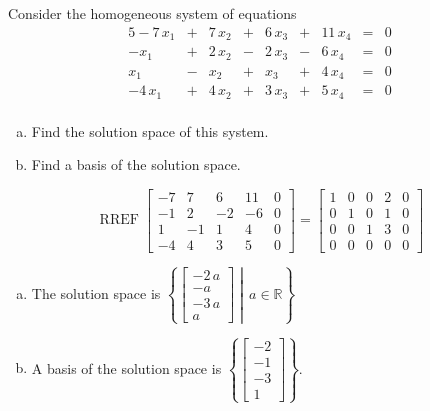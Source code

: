 
\begin{exerciseStatement}


Consider the homogeneous system of equations 
\begin{alignat*}{5} -7 \, x_{1} &+& 7 \, x_{2} &+& 6 \, x_{3} &+& 11 \, x_{4} &=& 0 \\-x_{1} &+& 2 \, x_{2} &-& 2 \, x_{3} &-& 6 \, x_{4} &=& 0 \\x_{1} &-& x_{2} &+& x_{3} &+& 4 \, x_{4} &=& 0 \\-4 \, x_{1} &+& 4 \, x_{2} &+& 3 \, x_{3} &+& 5 \, x_{4} &=& 0 \\ \end{alignat*}
            


\begin{enumerate}[(a)]
\item  Find the solution space of this system.
\item  Find a basis of the solution space.
\end{enumerate}
    
\end{exerciseStatement}
    
\begin{exerciseAnswer} 


\[\operatorname{RREF} \left[\begin{array}{cccc|c}
-7 & 7 & 6 & 11 & 0 \\
-1 & 2 & -2 & -6 & 0 \\
1 & -1 & 1 & 4 & 0 \\
-4 & 4 & 3 & 5 & 0
\end{array}\right] = \left[\begin{array}{cccc|c}
1 & 0 & 0 & 2 & 0 \\
0 & 1 & 0 & 1 & 0 \\
0 & 0 & 1 & 3 & 0 \\
0 & 0 & 0 & 0 & 0
\end{array}\right] \]


\begin{enumerate}[(a)]
\item The solution space is \( \left\{ \left[\begin{array}{c}
-2 \, a \\
-a \\
-3 \, a \\
a
\end{array}\right] \middle|\,a\in\mathbb{R}\right\} \)
\item A basis of the solution space is \( \left\{ \left[\begin{array}{c}
-2 \\
-1 \\
-3 \\
1
\end{array}\right] \right\} \).
\end{enumerate}
    
\end{exerciseAnswer}
    

